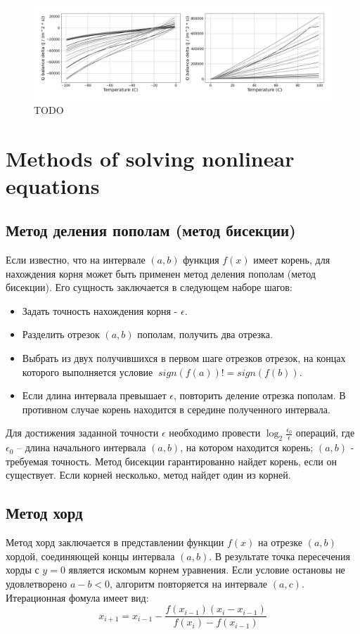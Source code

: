 \documentclass[
11pt,%
tightenlines,%
twoside,%
onecolumn,%
nofloats,%
nobibnotes,%
nofootinbib,%
superscriptaddress,%
noshowpacs,%
centertags]%
{revtex4}
\begin{document}
\begin{figure}[h]
\setcaptionmargin{5mm}
\onelinecaptionstrue
\includegraphics[width=1.0\textwidth]{pics/dq_rime_wet.pdf}
\caption{TODO}\label{fig:dq_rime_wet}
\end{figure}

\section{Methods of solving nonlinear equations}

\subsection{Метод деления пополам (метод бисекции)}
Если известно, что на интервале $(a, b)$ функция $f(x)$ имеет корень, для нахождения корня может быть применен метод деления пополам (метод бисекции). Его сущность заключается в следующем наборе шагов:
\begin{itemize}
\item Задать точность нахождения корня - $\epsilon$.
\item Разделить отрезок $(a, b)$ пополам, получить два отрезка.
\item Выбрать из двух получившихся в первом шаге отрезков отрезок, на концах которого выполняется условие $\ sign(f(a)) != sign(f(b))$.
\item Если длина интервала превышает $\epsilon$, повторить деление отрезка пополам. В противном случае корень находится в середине полученного интервала.
\end{itemize}
	
Для достижения заданной точности $\epsilon$ необходимо провести $\log_2\frac{\epsilon_0}{\epsilon}$  операций, где $\epsilon_0$ – длина начального интервала $(a, b)$, на котором находится корень; $(a, b)$ - требуемая точность. Метод бисекции гарантированно найдет корень, если он существует. Если корней несколько, метод найдет один из корней.

\subsection{Метод хорд}
Метод хорд заключается в представлении функции $f(x)$ на отрезке $(a, b)$ хордой, соединяющей концы интервала $(a,b)$. В результате точка пересечения хорды с $y=0$ является искомым корнем уравнения. Если условие остановы не удовлетворено $a-b<0$, алгоритм повторяется на интервале $(a,c)$. 
Итерационная фомула имеет вид:
\begin{equation}
x_{i+1}=x_{i-1}-\frac{f(x_{i-1})(x_i-x_{i-1})}{f(x_i)-f(x_{i-1})}
\end{equation}
\end{document}
